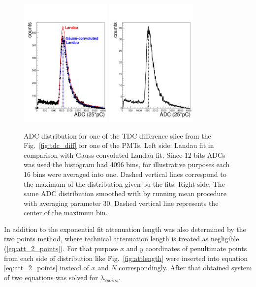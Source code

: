 \begin{figure}[]
\centering
\includegraphics[width=0.4\textwidth]{gleb/fig_gleb_att_length/att_langau.pdf}
\includegraphics[width=0.4\textwidth]{gleb/fig_gleb_att_length/maximum.pdf}
\caption{ADC distribution for one of the TDC difference slice from the Fig.~\ref{fig:tdc_diff} for one of the PMTs. Left side: Landau fit in comparison with Gauss-convoluted Landau fit. Since 12 bits ADCs was used the histogram had 4096 bins, for illustrative purposes each 16 bins were averaged into one. Dashed vertical lines correspond to the maximum of the distribution given bu the fits. Right side: The same ADC distribution smoothed with by running mean procedure with averaging parameter 30. Dashed vertical line represents the center of the maximum bin.  \label{fig:adc_maximum}}
\end{figure}

In addition to the exponential fit attenuation length was also determined by the two points method, where technical attenuation length is treated as negligible (\ref{eq:att_2_points}). For that purpose $x$ and $y$ coordinates of penultimate points from each side of distribution like Fig.~\ref{fig:attlength} were inserted into equation \ref{eq:att_2_points} instead of $x$ and $N$ correspondingly. After that obtained system of two equations was solved for $\lambda_{2 poins}$.


